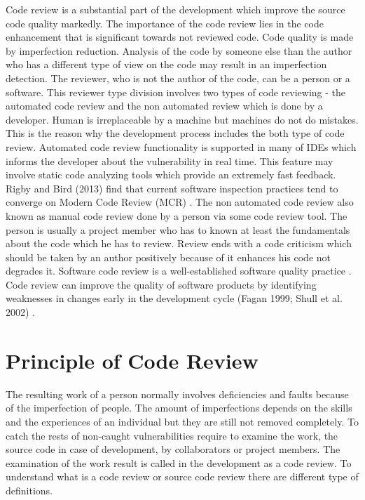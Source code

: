 Code review is a substantial part of the development which improve the source code quality markedly. The importance of the code review lies in the code enhancement that is significant towards not reviewed code. Code quality is made by imperfection reduction. Analysis of the code by someone else than the author who has a different type of view on the code may result in an imperfection detection. The reviewer, who is not the author of the code, can be a person or a software. This reviewer type division involves two types of code reviewing - the automated code review and the non automated review which is done by a developer. Human is irreplaceable by a machine but machines do not do mistakes. This is the reason why the development process includes the both type of code review. Automated code review functionality is supported in many of IDEs which informs the developer about the vulnerability in real time. This feature may involve static code analyzing tools which provide an extremely fast feedback. Rigby and Bird (2013) find that current software inspection practices tend to converge on Modern Code Review (MCR) \cite{review_participation}. The non automated code review also known as manual code review done by a person via some code review tool. The person is usually a project member who has to known at least the fundamentals about the code which he has to review. Review ends with a code criticism which should be taken by an author positively because of it enhances his code not degrades it. Software code review is a well-established software quality practice \cite{review_participation}. Code review can improve the quality of software products by identifying weaknesses in changes early in the development cycle (Fagan 1999; Shull et al. 2002) \cite{review_participation}.

\section{Principle of Code Review}\label{fig:sec_pri_CR}

The resulting work of a person normally involves deficiencies and faults because of the imperfection of people. The amount of imperfections depends on the skills and the experiences of an individual but they are still not removed completely. To catch the rests of non-caught vulnerabilities require to examine the work, the source code in case of development, by collaborators or project members. The examination of the work result is called in the development as a code review. To understand what is a code review or source code review there are different type of definitions.

